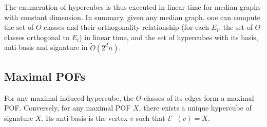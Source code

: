 \documentclass[a4paper,UKenglish,numberwithinsect,cleveref, autoref,anonymous]{lipics-v2021}
\begin{document}
The enumeration of hypercubes is thus executed in linear time for median graphs with constant dimension. In summary, given any median graph, one can compute the set of $\Theta$-classes and their orthogonality relationship (for each $E_i$, the set of $\Theta$-classes orthogonal to $E_i$) in linear time, and the set of hypercubes with its basis, anti-basis and signature in $\tilde{O}(2^dn)$.

\subsection{Maximal POFs} \label{asubsec:max_pofs}

\begin{theorem}
For any maximal induced hypercube, the $\Theta$-classes of its edges form a maximal POF.
Conversely, for any maximal POF $X$, there exists a unique hypercube of signature $X$. Its anti-basis is the vertex $v$ such that $\mathcal{E}^-(v) = X$. 
\label{th:maximal_pofs}
\end{theorem}
\end{document}
